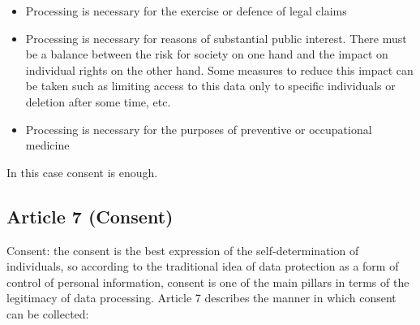 \begin{itemize}
\begin{itemize}
        \item Processing is necessary for the exercise or defence of legal claims
        \item Processing is necessary for reasons of substantial public interest. There must be a balance between the risk for society on one hand and the impact on individual rights on the other hand. Some measures to reduce this impact can be taken such as limiting access to this data only to specific individuals or deletion after some time, etc.
        \item Processing is necessary for the purposes of preventive or occupational medicine
    \end{itemize}
    In this case consent is enough.
\end{itemize}

\subsection{Article 7 (Consent)}
Consent: the consent is the best expression of the self-determination of individuals, so according to the traditional idea of data protection as a form of control of personal information, consent is one of the main pillars in terms of the legitimacy of data processing.
Article 7 describes the manner in which consent can be collected:
